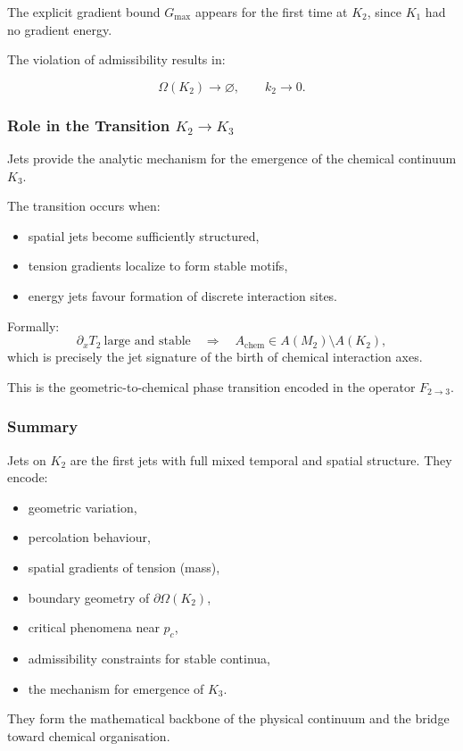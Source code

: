 The explicit gradient bound $G_{\max}$ appears for the first time at
$K_2$, since $K_1$ had no gradient energy.

The violation of admissibility results in:

\[
\Omega(K_2)\to\varnothing,
\qquad
k_2 \to 0.
\]



\subsubsection{Role in the Transition \texorpdfstring{\texorpdfstring{$K_2\to K_3$}{K_2\to K_3}}{K2→K3}}

Jets provide the analytic mechanism for the emergence of the chemical
continuum $K_3$.

The transition occurs when:

\begin{itemize}
    \item spatial jets become sufficiently structured,
    \item tension gradients localize to form stable motifs,
    \item energy jets favour formation of discrete interaction sites.
\end{itemize}

Formally:
\[
\partial_x T_2 \ \text{large and stable}
\quad\Longrightarrow\quad
A_{\mathrm{chem}}\in A(M_2)\setminus A(K_2),
\]
which is precisely the jet signature of the birth of chemical
interaction axes.

This is the geometric-to-chemical phase transition encoded in the
operator $F_{2\to3}$.



\subsubsection{Summary}

Jets on $K_2$ are the first jets with full mixed temporal and spatial
structure. They encode:

\begin{itemize}
    \item geometric variation,
    \item percolation behaviour,
    \item spatial gradients of tension (mass),
    \item boundary geometry of $\partial\Omega(K_2)$,
    \item critical phenomena near $p_c$,
    \item admissibility constraints for stable continua,
    \item the mechanism for emergence of $K_3$.
\end{itemize}

They form the mathematical backbone of the physical continuum and the
bridge toward chemical organisation.

